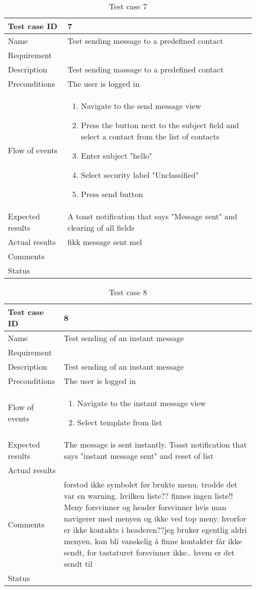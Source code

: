 \begin{table}
\begin{tabular}{l|p{10cm}}
Test case ID & 7 \\ \hline
Name & Test sending message to a predefined contact\\ \hline
Requirement & \\ \hline
Description & Test sending massage to a predefined contact\\ \hline
Preconditions & The user is logged in\\ \hline
Flow of events & 
\begin{enumerate}
\item{}Navigate to the send message view
\item{}Press the button next to the subject field and select a contact from the list of contacts
\item{}Enter subject "hello"
\item{}Select security label "Unclassified"
\item{}Press send button
\end{enumerate} \\ \hline
Expected results & A toast notification that says "Message sent" and clearing of all fields\\ \hline \hline
Actual results & fikk message sent mel \\ \hline
Comments & \\ \hline
Status & 
\end{tabular}
\caption{Test case 7} \label{tab:case7}
\end{table}

\begin{table}
\begin{tabular}{l|p{10cm}}
Test case ID & 8 \\ \hline
Name & Test sending of an instant message\\ \hline
Requirement & \\ \hline
Description & Test sending of an instant message\\ \hline
Preconditions & The user is logged in\\ \hline
Flow of events & 
\begin{enumerate}
\item{}Navigate to the instant message view
\item{}Select template from list
\end{enumerate} \\ \hline
Expected results & The message is sent instantly. Toast notification that says "instant message sent" and reset of list\\ \hline \hline
Actual results & \\ \hline
Comments & forstod ikke symbolet før brukte menu. trodde det var en warning. hvilken liste?? finnes ingen liste!! Meny forsvinner og header forsvinner hvis man navigerer med menyen og ikke ved top meny. hvorfor er ikke kontakts i headeren??jeg bruker egentlig aldri menyen, kan bli vanskelig å finne kontakter får ikke sendt, for tastaturet forsvinner ikke.. hvem er det sendt til\\ \hline
Status & 
\end{tabular}
\caption{Test case 8} \label{tab:case8}
\end{table}

